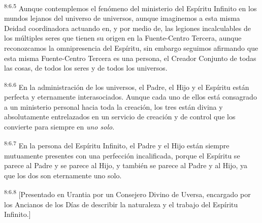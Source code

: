 \par
\textsuperscript{8:6.5} Aunque contemplemos el fenómeno del ministerio del Espíritu Infinito en los mundos lejanos del universo de universos, aunque imaginemos a esta misma Deidad coordinadora actuando en, y por medio de, las legiones incalculables de los múltiples seres que tienen su origen en la Fuente-Centro Tercera, aunque reconozcamos la omnipresencia del Espíritu, sin embargo seguimos afirmando que esta misma Fuente-Centro Tercera es una persona, el Creador Conjunto de todas las cosas, de todos los seres y de todos los universos.

\par
\textsuperscript{8:6.6} En la administración de los universos, el Padre, el Hijo y el Espíritu están perfecta y eternamente interasociados. Aunque cada uno de ellos está consagrado a un ministerio personal hacia toda la creación, los tres están divina y absolutamente entrelazados en un servicio de creación y de control que los convierte para siempre en \textit{uno solo.}

\par
\textsuperscript{8:6.7} En la persona del Espíritu Infinito, el Padre y el Hijo están siempre mutuamente presentes con una perfección incalificada, porque el Espíritu se parece al Padre y se parece al Hijo, y también se parece al Padre y al Hijo, ya que los dos son eternamente uno solo.

\par
\textsuperscript{8:6.8} [Presentado en Urantia por un Consejero Divino de Uversa, encargado por los Ancianos de los Días de describir la naturaleza y el trabajo del Espíritu Infinito.]